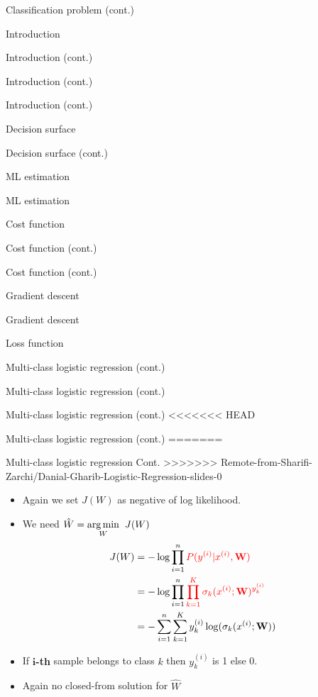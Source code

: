 \documentclass[serif, aspectratio=169]{beamer}
\begin{document}
\begin{frame}{Classification problem (cont.)}
\begin{itemize}
\begin{frame}{Introduction}
\begin{itemize}
\begin{frame}{Introduction (cont.)}
\begin{frame}{Introduction (cont.)}
\begin{frame}{Introduction (cont.)}
\begin{frame}{Decision surface}
\begin{itemize}
\begin{frame}{Decision surface (cont.)}
\begin{frame}{ML estimation}
\begin{frame}{ML estimation}
\begin{itemize}
\begin{frame}{Cost function}
\begin{frame}{Cost function (cont.)}
\begin{itemize}
\begin{itemize}
\begin{frame}{Cost function (cont.)}
\begin{frame}{Gradient descent}
\begin{frame}{Gradient descent}
\begin{frame}{Loss function}
\begin{frame}{Multi-class logistic regression (cont.)}
\begin{frame}{Multi-class logistic regression (cont.)}
\begin{frame}{Multi-class logistic regression (cont.)}
<<<<<<< HEAD
\begin{frame}{Multi-class logistic regression (cont.)}
=======
\begin{frame}{Multi-class logistic regression Cont.}
>>>>>>> Remote-from-Sharifi-Zarchi/Danial-Gharib-Logistic-Regression-slides-0
    \begin{itemize}
        \item Again we set $J(W)$ as negative of log likelihood.
        \item We need $\hat{W} = \underset{W}{\arg\min} \hspace{0.2cm} J(W)$
        \begin{align*}
            J(W) &= -\log \prod_{i=1}^{n} \textcolor{red}{P(y^{(i)}|x^{(i)}, \mathbf{W})} \\
            &= -\log \prod_{i=1}^{n}\textcolor{red}{\prod_{k=1}^{K}\sigma _k(x^{(i)}; \mathbf{W})^{y_k^{(i)}} }\\
            &= -\sum_{i=1}^{n}\sum_{k=1}^{K}y_k^{(i)} \log (\sigma _k(x^{(i)}; \mathbf{W}))
        \end{align*}
        \item If \textbf{$\textbf{i}$-th} sample belongs to class $k$ then $y^{(i)}_k$ is 1 else 0.
        \item Again no closed-from solution for $\hat{W}$
    \end{itemize}
    

\end{frame}
\end{frame}
\end{frame}
\end{frame}
\end{frame}
\end{frame}
\end{frame}
\end{frame}
\end{frame}
\end{itemize}
\end{itemize}
\end{frame}
\end{frame}
\end{itemize}
\end{frame}
\end{frame}
\end{frame}
\end{itemize}
\end{frame}
\end{frame}
\end{frame}
\end{frame}
\end{itemize}
\end{frame}
\end{itemize}
\end{frame}
\end{document}
